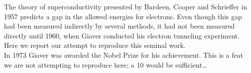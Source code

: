 
The theory of superconductivity presented by Bardeen, Cooper and Schrieffer in 1957 predicts a gap in the allowed energies for electrons. Even though this gap had been measured indirectly by several methods, it had not been measured directly until 1960, when Giaver conducted his electron tunneling experiment. Here we report our attempt to reproduce this seminal work.\\
In 1973 Giaver was awarded the Nobel Prize for his achievement. This is a feat we are not attempting to reproduce here; a 10 would be sufficient\dots
